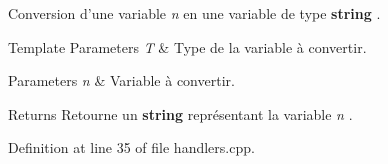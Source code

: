 Conversion d'une variable {\itshape n} en une variable de type {\bfseries string} . 


\begin{DoxyTemplParams}{Template Parameters}
{\em T} & Type de la variable à convertir. \\
\hline
\end{DoxyTemplParams}

\begin{DoxyParams}{Parameters}
{\em n} & Variable à convertir. \\
\hline
\end{DoxyParams}
\begin{DoxyReturn}{Returns}
Retourne un {\bfseries string} représentant la variable {\itshape n} . 
\end{DoxyReturn}


Definition at line 35 of file handlers.\-cpp.

